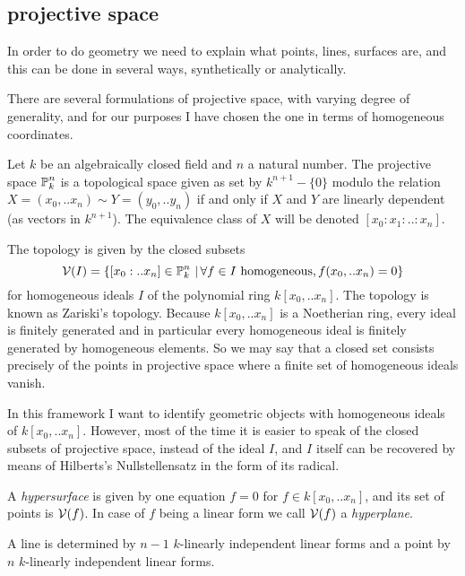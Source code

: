 \subsection{projective space}

In order to do geometry we need to explain what points, lines, surfaces are, and this can be done in several ways, synthetically or analytically.

There are several formulations of projective space, with varying degree of generality, and for our purposes I have chosen the one in terms of homogeneous coordinates.

Let $k$ be an algebraically closed field and $n$ a natural number.
The projective space $\operatorname{\mathbb P}^n_k$ is a topological space given as set by  $k^{n+1} - \{ 0 \}$ modulo the relation $X=(x_0,..x_n) \sim Y=(y_0,..y_n)$ if and only if $X$ and $Y$ are linearly dependent (as vectors in $k^{n+1}$). The equivalence class of $X$ will be denoted $[x_0:x_1:..:x_n]$.

The topology is given by the closed subsets
\begin{equation}
\operatorname{\mathcal V}(I) =
\left\lbrace [x_0:..x_n] \in \operatorname{\mathbb P}^n_k\,|\,  \forall f\in I \text{ homogeneous}, f(x_0,..x_n) = 0\right\rbrace
\end{equation}
for homogeneous ideals $I$ of the polynomial ring $k[x_0,..x_n]$.
The topology is known as Zariski's topology.
Because $k[x_0,..x_n]$ is a Noetherian ring, every ideal is finitely generated and in particular every homogeneous ideal is finitely generated by homogeneous elements.
So we may say that a closed set consists precisely of the points in projective space where a finite set of homogeneous ideals vanish.

In this framework I want to identify geometric objects with homogeneous ideals of $k[x_0,..x_n]$.
However, most of the time it is easier to speak of the closed subsets of projective space, instead of the ideal $I$, and $I$ itself can be recovered by means of Hilberts's Nullstellensatz in the form of its radical.

A \emph{hypersurface} is given by one equation $f=0$ for $f\in k[x_0,..x_n]$, and its set of points is $\operatorname{\mathcal V}(f)$.
In case of $f$ being a linear form we call $\operatorname{\mathcal V}(f)$ a \emph{hyperplane}.

A line is determined by $n-1$ $k$-linearly independent linear forms and a point by $n$ $k$-linearly independent linear forms.



